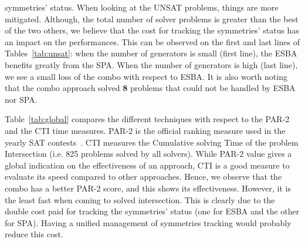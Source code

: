 symmetries’ status. When looking at the UNSAT problems, things are more
mitigated. Although, the total number of solver problems is greater than the
best of the two others, we believe that the cost for tracking the symmetries’
status has an impact on the performances. This can be observed on the first and
last lines of Tables~\ref{tab:unsat}: when the number of generators is small
(first line), the ESBA benefits greatly from the SPA. When the number of
generators is high (last line), we see a small loss of the combo with respect
to ESBA. It is also worth noting that the combo approach solved \textbf{8} problems 
that could not be handled by ESBA nor SPA.
\begin{table}[!htbp]
 \begin{center}
 \end{center}
 \caption{Comparison of PAR-2 and CTI times (in seconds) of the global solving.}
 \label{tab:global}
\end{table}
Table~\ref{tab:global} compares the different techniques with respect to the
PAR-2 and the CTI time measures. PAR-2 is the official ranking measure used in
the yearly SAT contests~\cite{jarvisalo2012international}. CTI measures the
Cumulative solving Time of the problem Intersection (i.e. 825 problems solved
by all solvers). While PAR-2 value gives a global indication on the
effectiveness of an approach, CTI is a good measure to evaluate its speed compared
to other approaches.
Hence, we observe that the combo has a better PAR-2 score, and this shows its
effectiveness. However, it is the least fast when coming to solved intersection.
This is clearly due to the double cost paid for tracking the symmetries’ status
(one for ESBA and the other for SPA). Having a unified management of
symmetries tracking would probably reduce this cost.
